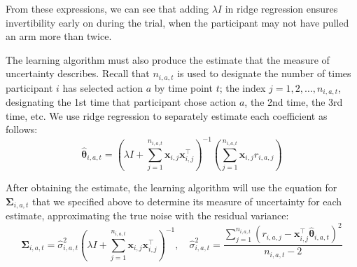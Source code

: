 \documentclass[letterpaper, 9pt]{extarticle}
\newcounter{nyscommentcounter}
\newcommand{\nys}[1]{%
  \stepcounter{nyscommentcounter}%
  {\color{nyscolor} [\textbf{NYS} (\thenyscommentcounter): {#1}]}%
}
\begin{document}
From these expressions, we can see that adding $\lambda I$ in ridge regression ensures invertibility early on during the trial, when the participant may not have pulled an arm more than twice.

The learning algorithm must also produce the estimate that the measure of uncertainty describes. Recall that $n_{i,a,t}$ is used to designate the number of times participant $i$ has selected action $a$ by time point $t$; the index $j=1, 2, \hdots, n_{i,a,t}$, designating the 1st time that participant chose action $a$, the 2nd time, the 3rd time, etc. We use ridge regression to separately estimate each coefficient as follows: 
\[
\hat{\boldsymbol{\theta}}_{i,a,t}
=
\left(
\lambda I +
\sum_{j=1}^{n_{i,a,t}} \boldsymbol{x}_{i,j}\boldsymbol{x}_{i,j}^\top
\right)^{-1}
\left(
\sum_{j=1}^{n_{i,a,t}} \boldsymbol{x}_{i,j} r_{i,a,j}
\right)
\]

After obtaining the estimate, the learning algorithm will use the equation for $\boldsymbol{\Sigma}_{i,a,t}$ that we specified above to determine its measure of uncertainty for each estimate, approximating the true noise with the residual variance:
\[
\boldsymbol{\Sigma}_{i,a,t}
=
\hat{\sigma}_{i,a,t}^2
\left(
\lambda I
+
\sum_{j=1}^{n_{i,a,t}} \boldsymbol{x}_{i,j}\boldsymbol{x}_{i,j}^\top
\right)^{-1}, \quad \hat{\sigma}_{i,a,t}^2
=
\frac{
\sum_{j=1}^{n_{i,a,t}}
\left(
r_{i,a,j}
-
\boldsymbol{x}_{i,j}^\top \hat{\boldsymbol{\theta}}_{i,a,t}
\right)^2
}{
n_{i,a,t}-2
}
\]
\end{document}
